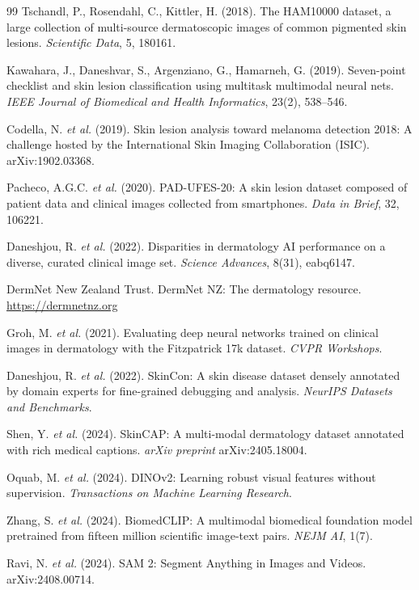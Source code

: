 \begin{thebibliography}{99}
Tschandl, P., Rosendahl, C., Kittler, H. (2018). The HAM10000 dataset, a large collection of multi-source dermatoscopic images of common pigmented skin lesions. \emph{Scientific Data}, 5, 180161.

Kawahara, J., Daneshvar, S., Argenziano, G., Hamarneh, G. (2019). Seven-point checklist and skin lesion classification using multitask multimodal neural nets. \emph{IEEE Journal of Biomedical and Health Informatics}, 23(2), 538--546.

Codella, N. \emph{et al.} (2019). Skin lesion analysis toward melanoma detection 2018: A challenge hosted by the International Skin Imaging Collaboration (ISIC). arXiv:1902.03368.

Pacheco, A.G.C. \emph{et al.} (2020). PAD-UFES-20: A skin lesion dataset composed of patient data and clinical images collected from smartphones. \emph{Data in Brief}, 32, 106221.

Daneshjou, R. \emph{et al.} (2022). Disparities in dermatology AI performance on a diverse, curated clinical image set. \emph{Science Advances}, 8(31), eabq6147.

DermNet New Zealand Trust. DermNet NZ: The dermatology resource. \url{https://dermnetnz.org}

Groh, M. \emph{et al.} (2021). Evaluating deep neural networks trained on clinical images in dermatology with the Fitzpatrick 17k dataset. \emph{CVPR Workshops}.

Daneshjou, R. \emph{et al.} (2022). SkinCon: A skin disease dataset densely annotated by domain experts for fine-grained debugging and analysis. \emph{NeurIPS Datasets and Benchmarks}.

Shen, Y. \emph{et al.} (2024). SkinCAP: A multi-modal dermatology dataset annotated with rich medical captions. \emph{arXiv preprint} arXiv:2405.18004.

Oquab, M. \emph{et al.} (2024). DINOv2: Learning robust visual features without supervision. \emph{Transactions on Machine Learning Research}.

Zhang, S. \emph{et al.} (2024). BiomedCLIP: A multimodal biomedical foundation model pretrained from fifteen million scientific image-text pairs. \emph{NEJM AI}, 1(7).

Ravi, N. \emph{et al.} (2024). SAM 2: Segment Anything in Images and Videos. arXiv:2408.00714.


\end{thebibliography}
